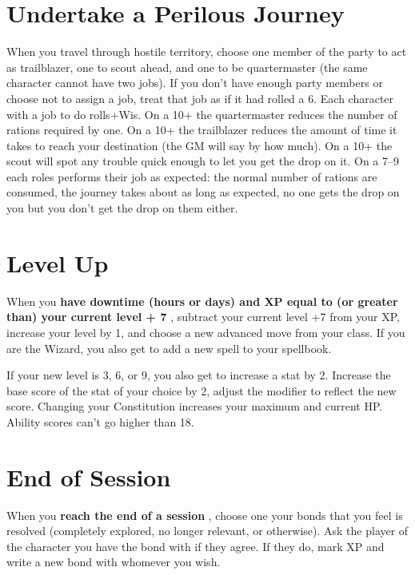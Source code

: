        
\section{Undertake a Perilous Journey}     
       

When you travel through hostile territory, choose one member of the party to act as trailblazer, one to scout ahead, and one to be quartermaster (the same character cannot have two jobs). If you don't have enough party members or choose not to assign a job, treat that job as if it had rolled a 6. Each character with a job to do rolls+Wis. On a 10+ the quartermaster reduces the number of rations required by one. On a 10+ the trailblazer reduces the amount of time it takes to reach your destination (the GM will say by how much). On a 10+ the scout will spot any trouble quick enough to let you get the drop on it. On a 7–9 each roles performs their job as expected: the normal number of rations are consumed, the journey takes about as long as expected, no one gets the drop on you but you don't get the drop on them either.

       
\section{Level Up}   
       

When you {\bf have downtime (hours or days) and XP equal to (or greater than) your current level + 7} , subtract your current level +7 from your XP, increase your level by 1, and choose a new advanced move from your class. If you are the Wizard, you also get to add a new spell to your spellbook.

       

If your new level is 3, 6, or 9, you also get to increase a stat by 2. Increase the base score of the stat of your choice by 2, adjust the modifier to reflect the new score. Changing your Constitution increases your maximum and current HP. Ability scores can't go higher than 18.

       
\section{End of Session}   
       

When you {\bf reach the end of a session} , choose one your bonds that you feel is resolved (completely explored, no longer relevant, or otherwise). Ask the player of the character you have the bond with if they agree. If they do, mark XP and write a new bond with whomever you wish.

